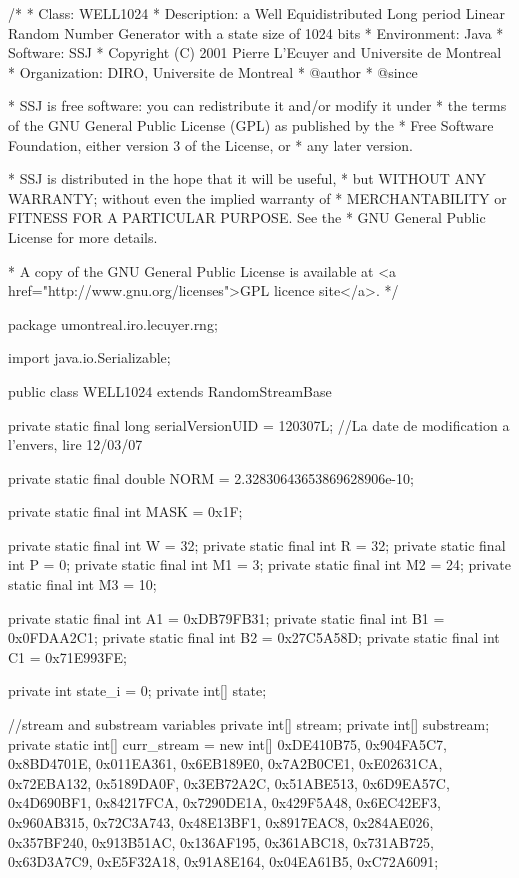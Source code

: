 \begin{code}
\begin{hide}
/*
 * Class:        WELL1024
 * Description:  a Well Equidistributed Long period Linear Random Number
                 Generator with a state size of 1024 bits
 * Environment:  Java
 * Software:     SSJ
 * Copyright (C) 2001  Pierre L'Ecuyer and Universite de Montreal
 * Organization: DIRO, Universite de Montreal
 * @author
 * @since

 * SSJ is free software: you can redistribute it and/or modify it under
 * the terms of the GNU General Public License (GPL) as published by the
 * Free Software Foundation, either version 3 of the License, or
 * any later version.

 * SSJ is distributed in the hope that it will be useful,
 * but WITHOUT ANY WARRANTY; without even the implied warranty of
 * MERCHANTABILITY or FITNESS FOR A PARTICULAR PURPOSE.  See the
 * GNU General Public License for more details.

 * A copy of the GNU General Public License is available at
   <a href="http://www.gnu.org/licenses">GPL licence site</a>.
 */
\end{hide}
package umontreal.iro.lecuyer.rng; \begin{hide}

import java.io.Serializable;
\end{hide}

public class WELL1024 extends RandomStreamBase \begin{hide} {

   private static final long serialVersionUID = 120307L;
   //La date de modification a l'envers, lire 12/03/07

   private static final double NORM = 2.32830643653869628906e-10;

   private static final int MASK = 0x1F;

   private static final int W = 32;
   private static final int R = 32;
   private static final int P = 0;
   private static final int M1 = 3;
   private static final int M2 = 24;
   private static final int M3 = 10;

   private static final int A1 = 0xDB79FB31;
   private static final int B1 = 0x0FDAA2C1;
   private static final int B2 = 0x27C5A58D;
   private static final int C1 = 0x71E993FE;

   private int state_i = 0;
   private int[] state;

   //stream and substream variables
   private int[] stream;
   private int[] substream;
   private static int[] curr_stream =
                    new int[] {0xDE410B75, 0x904FA5C7, 0x8BD4701E, 0x011EA361,
                               0x6EB189E0, 0x7A2B0CE1, 0xE02631CA, 0x72EBA132,
                               0x5189DA0F, 0x3EB72A2C, 0x51ABE513, 0x6D9EA57C,
                               0x4D690BF1, 0x84217FCA, 0x7290DE1A, 0x429F5A48,
                               0x6EC42EF3, 0x960AB315, 0x72C3A743, 0x48E13BF1,
                               0x8917EAC8, 0x284AE026, 0x357BF240, 0x913B51AC,
                               0x136AF195, 0x361ABC18, 0x731AB725, 0x63D3A7C9,
                               0xE5F32A18, 0x91A8E164, 0x04EA61B5, 0xC72A6091};


}
\end{hide}
\end{code}
